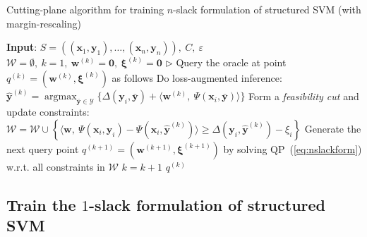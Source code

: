 \documentclass[9pt]{extarticle}
\DeclareMathOperator*{\argmax}{argmax}
\begin{document}
\begin{algorithm}[htbp]
\caption{Cutting-plane algorithm for training $n$-slack formulation of structured SVM (with margin-rescaling)}
\label{alg:nslacktrain}
\begin{algorithmic}[1]
\STATE \textbf{Input}: $S = \left( (\mathbf{x}_1, \mathbf{y}_1), \dots, (\mathbf{x}_n, \mathbf{y}_n) \right),~ C,~ \varepsilon$
\STATE $\mathcal{W} = \emptyset,~ k = 1,~ \mathbf{w}^{(k)} = \mathbf{0},~ \bm{\xi}^{(k)} = \mathbf{0}$
\REPEAT
        \STATE $\triangleright$ Query the oracle at point $q^{(k)} = (\mathbf{w}^{(k)}, \bm{\xi}^{(k)})$ as follows
        \STATE Do loss-augmented inference:~
               $\hat{\mathbf{y}}^{(k)} = \argmax_{\bar{\mathbf{y}} \in \mathcal{Y}} \{ \Delta(\mathbf{y}_i, \bar{\mathbf{y}}) + 
                \langle \mathbf{w}^{(k)},~ \Psi(\mathbf{x}_i, \bar{\mathbf{y}}) \rangle \}$ 
            \STATE Form a \emph{feasibility cut} and update constraints:~
                   $\mathcal{W} = \mathcal{W} \cup 
                    \left\{ \langle \mathbf{w},~ \Psi(\mathbf{x}_i, \mathbf{y}_i) - \Psi(\mathbf{x}_i, \hat{\mathbf{y}}^{(k)}) \rangle \ge 
                    \Delta(\mathbf{y}_i, \hat{\mathbf{y}}^{(k)}) - \xi_i \right\}$ 
            \STATE Generate the next query point $q^{(k+1)} = (\mathbf{w}^{(k+1)}, \bm{\xi}^{(k+1)})$ 
                   by solving QP~(\ref{eq:nslackform}) w.r.t. all constraints in $\mathcal{W}$
            \STATE $k = k+1$
        \ENDIF
    \ENDFOR
\RETURN $q^{(k)}$
\end{algorithmic}
\end{algorithm}


\subsection{Train the $1$-slack formulation of structured SVM}
\label{sec:1slackssvm}
\end{document}
